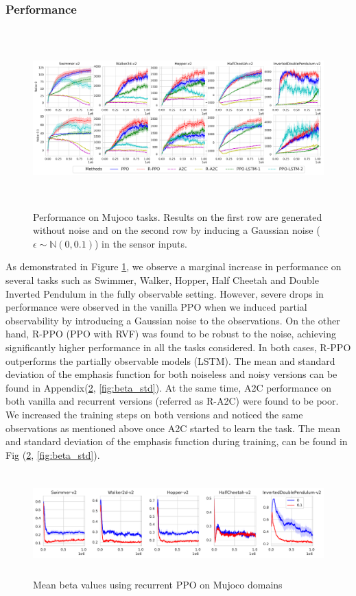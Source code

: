 \subsubsection{Performance}
\begin{figure}[H]
    \centering
    \includegraphics[width=\textwidth,height=6.9cm]{./fig/perf_mujoco.pdf}
    \caption[Performance on Mujoco]{Performance on Mujoco tasks. Results on the first row are generated without noise  and on the second row by inducing a Gaussian noise ($\epsilon \sim \mathbb{N}(0,0.1)$) in the sensor inputs.}
    \label{fig:perf_mujoco_final}
\end{figure}
As demonstrated in Figure \ref{fig:perf_mujoco_final}, we observe a marginal increase in performance on several tasks such as Swimmer, Walker, Hopper, Half Cheetah and Double Inverted Pendulum in the fully observable setting. However, severe drops in performance were observed in the vanilla PPO when we induced partial observability by introducing a Gaussian noise to the observations. On the other hand, R-PPO (PPO with RVF) was found to be robust to the noise, achieving significantly higher performance in all the tasks considered. In both cases, R-PPO outperforms the partially observable models (LSTM). The mean and standard deviation of the emphasis function for both noiseless and noisy versions can be found in Appendix(\ref{fig:beta_mean}, \ref{fig:beta_std}). At the same time, A2C performance on both vanilla and recurrent versions (referred as R-A2C) were found to be poor. We increased the training steps on both versions and noticed the same observations as mentioned above once A2C started to learn the task. The  mean and standard deviation of the emphasis function during training, can be found in Fig (\ref{fig:beta_mean},  \ref{fig:beta_std}).
\begin{figure}[h]
    \centering
    \includegraphics[width=\textwidth, height=4cm]{fig/beta_mean.pdf}
    \caption{Mean beta values using recurrent PPO on Mujoco domains}
    \label{fig:beta_mean}
\end{figure}
